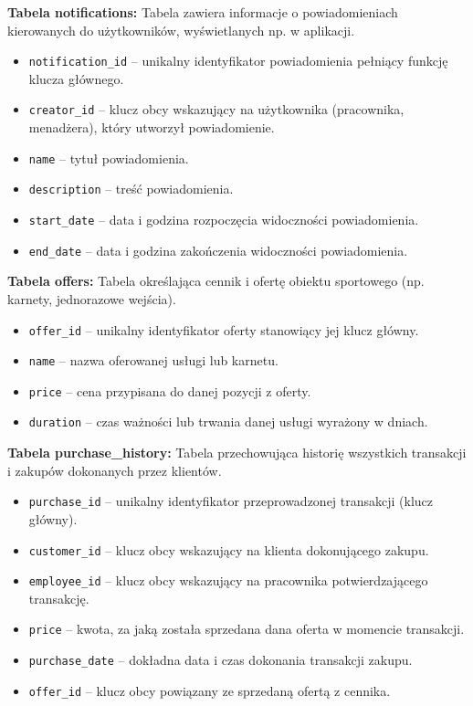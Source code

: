 \noindent\textbf{Tabela notifications:} Tabela zawiera informacje o powiadomieniach kierowanych do użytkowników, wyświetlanych np. w aplikacji.
\begin{itemize}[noitemsep, topsep=0pt]
    \item \texttt{notification\_id} -- unikalny identyfikator powiadomienia pełniący funkcję klucza głównego.
    \item \texttt{creator\_id} -- klucz obcy wskazujący na użytkownika (pracownika, menadżera), który utworzył powiadomienie.
    \item \texttt{name} -- tytuł powiadomienia.
    \item \texttt{description} -- treść powiadomienia.
    \item \texttt{start\_date} -- data i godzina rozpoczęcia widoczności powiadomienia.
    \item \texttt{end\_date} -- data i godzina zakończenia widoczności powiadomienia.
\end{itemize}

\noindent\textbf{Tabela offers:} Tabela określająca cennik i ofertę obiektu sportowego (np. karnety, jednorazowe wejścia).
\begin{itemize}[noitemsep, topsep=0pt]
    \item \texttt{offer\_id} -- unikalny identyfikator oferty stanowiący jej klucz główny.
    \item \texttt{name} -- nazwa oferowanej usługi lub karnetu.
    \item \texttt{price} -- cena przypisana do danej pozycji z oferty.
    \item \texttt{duration} -- czas ważności lub trwania danej usługi wyrażony w dniach.
\end{itemize}

\noindent\textbf{Tabela purchase\_history:} Tabela przechowująca historię wszystkich transakcji i zakupów dokonanych przez klientów.
\begin{itemize}[noitemsep, topsep=0pt]
    \item \texttt{purchase\_id} -- unikalny identyfikator przeprowadzonej transakcji (klucz główny).
    \item \texttt{customer\_id} -- klucz obcy wskazujący na klienta dokonującego zakupu.
    \item \texttt{employee\_id} -- klucz obcy wskazujący na pracownika potwierdzającego transakcję.
    \item \texttt{price} -- kwota, za jaką została sprzedana dana oferta w momencie transakcji.
    \item \texttt{purchase\_date} -- dokładna data i czas dokonania transakcji zakupu.
    \item \texttt{offer\_id} -- klucz obcy powiązany ze sprzedaną ofertą z cennika.
\end{itemize}

